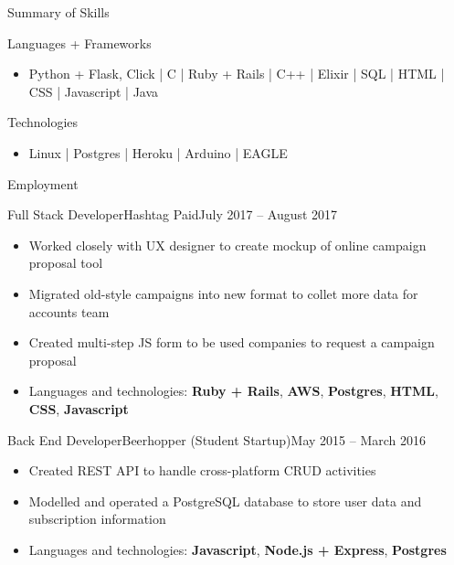\documentclass[calibri]{mcdowellcv}
\begin{document}
    \makeheader

    \begin{cvsection}{\Large{Summary of Skills}}
        \begin{cvsubsection}{Languages + Frameworks}{}{}
            \begin{itemize}
                \item Python + Flask, Click | C | Ruby + Rails | C++ | Elixir | SQL | HTML | CSS | Javascript | Java
            \end{itemize}
        \end{cvsubsection}
        \begin{cvsubsection}{Technologies}{}{}
            \begin{itemize}
                \item Linux | Postgres | Heroku | Arduino | EAGLE
            \end{itemize}
        \end{cvsubsection}
    \end{cvsection}

    \begin{cvsection}{\Large{Employment}}
        \begin{cvsubsection}{Full Stack Developer}{Hashtag Paid}{July 2017 -- August 2017}
            \begin{itemize}
                \item Worked closely with UX designer to create mockup of online campaign proposal tool
                \item Migrated old-style campaigns into new format to collet more data for accounts team
                \item Created multi-step JS form to be used companies to request a campaign proposal
                \item Languages and technologies: \textbf{Ruby + Rails}, \textbf{AWS}, \textbf{Postgres}, \textbf{HTML}, \textbf{CSS}, \textbf{Javascript}
            \end{itemize}
        \end{cvsubsection}

        \begin{cvsubsection}{Back End Developer}{Beerhopper (Student Startup)}{May 2015 -- March 2016}
            \begin{itemize}
                \item Created REST API to handle cross-platform CRUD activities
                \item Modelled and operated a PostgreSQL database to store user data and subscription information
                \item Languages and technologies: \textbf{Javascript}, \textbf{Node.js + Express}, \textbf{Postgres}
            \end{itemize}
        \end{cvsubsection}
    \end{cvsection}
\end{document}

